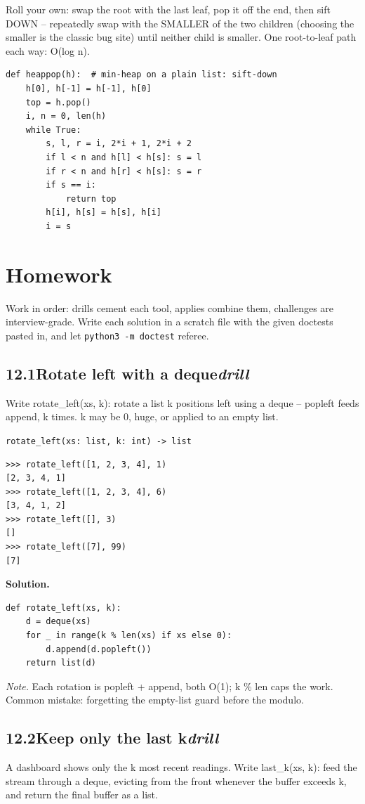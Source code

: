 \documentclass[10pt,letterpaper]{book}
\begin{document}
Roll your own: swap the root with the last leaf, pop it off the end, then sift DOWN -- repeatedly swap with the SMALLER of the two children (choosing the smaller is the classic bug site) until neither child is smaller. One root-to-leaf path each way: O(log n).

\begin{lstlisting}[style=ex]
def heappop(h):  # min-heap on a plain list: sift-down
    h[0], h[-1] = h[-1], h[0]
    top = h.pop()
    i, n = 0, len(h)
    while True:
        s, l, r = i, 2*i + 1, 2*i + 2
        if l < n and h[l] < h[s]: s = l
        if r < n and h[r] < h[s]: s = r
        if s == i:
            return top
        h[i], h[s] = h[s], h[i]
        i = s
\end{lstlisting}

\section{Homework}
Work in order: drills cement each tool, applies combine them,
challenges are interview-grade. Write each solution in a scratch file with
the given doctests pasted in, and let \texttt{python3 -m doctest} referee.
\subsection*{12.1\quad Rotate left with a deque\hfill\textnormal{\textit{drill}}}
Write rotate\_left(xs, k): rotate a list k positions left using a deque -- popleft feeds append, k times. k may be 0, huge, or applied to an empty list.

\noindent\texttt{rotate\_left(xs: list, k: int) -> list}
\begin{lstlisting}[style=ex]
>>> rotate_left([1, 2, 3, 4], 1)
[2, 3, 4, 1]
>>> rotate_left([1, 2, 3, 4], 6)
[3, 4, 1, 2]
>>> rotate_left([], 3)
[]
>>> rotate_left([7], 99)
[7]
\end{lstlisting}
\noindent\textbf{Solution.}
\begin{lstlisting}[style=code]
def rotate_left(xs, k):
    d = deque(xs)
    for _ in range(k % len(xs) if xs else 0):
        d.append(d.popleft())
    return list(d)
\end{lstlisting}
\noindent\textit{Note.} Each rotation is popleft + append, both O(1); k \% len caps the work. Common mistake: forgetting the empty-list guard before the modulo.

\subsection*{12.2\quad Keep only the last k\hfill\textnormal{\textit{drill}}}
A dashboard shows only the k most recent readings. Write last\_k(xs, k): feed the stream through a deque, evicting from the front whenever the buffer exceeds k, and return the final buffer as a list.
\end{document}
